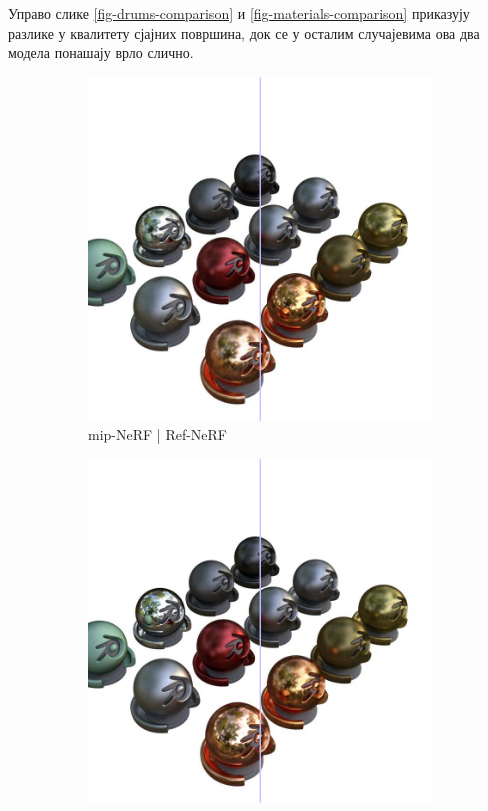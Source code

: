\documentclass[12pt, a4paper, twoside]{book}
\numberwithin{equation}{chapter}
\numberwithin{theorem}{section}
\numberwithin{definition}{section}
\numberwithin{definitionChapter}{chapter}
\begin{document}
Управо слике \ref{fig-drums-comparison} и \ref{fig-materials-comparison} приказују разлике у квалитету
сјајних површина, док се у осталим случајевима ова два модела понашају врло слично.

	\begin{figure}[H]
		\centering
		\begin{subfigure}{0.475\textwidth}
			\centering
			\includegraphics[scale=0.25]{img/comparison/mipnerf_vs_refnerf_materials_36.png}
			\caption{mip-NeRF | Ref-NeRF}
		\end{subfigure}
		\begin{subfigure}{0.475\textwidth}
			\centering
			\includegraphics[scale=0.25]{img/comparison/refnerf_vs_mipnerf_materials_36.png}

\end{subfigure}
\end{figure}
\end{document}
